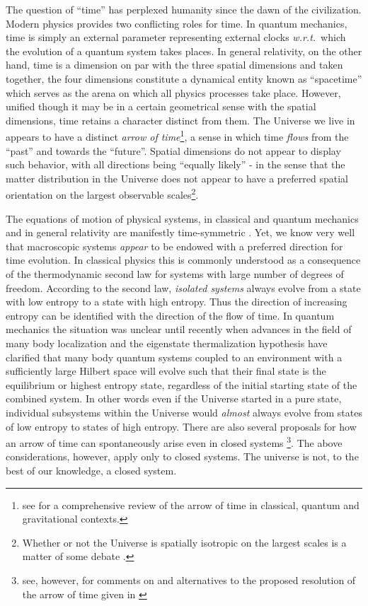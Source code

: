 \documentclass[preprint]{SciPost}
\newcommand{\wrt}{\textit{w.r.t.}~}
\theoremstyle{plain} %
\begin{document}
The question of ``time'' has perplexed humanity since the dawn of the civilization. Modern physics provides two conflicting roles for time. In quantum mechanics, time is simply an external parameter representing external clocks \wrt which the evolution of a quantum system takes places. In general relativity, on the other hand, time is a dimension on par with the three spatial dimensions and taken together, the four dimensions constitute a dynamical entity known as ``spacetime'' which serves as the arena on which all physics processes take place. However, unified though it may be in a certain geometrical sense with the spatial dimensions, time retains a character distinct from them. The Universe we live in appears to have a distinct \textit{arrow of time}\footnote{see \cite{Zeh1989The-Physical} for a comprehensive review of the arrow of time in classical, quantum and gravitational contexts.}, a sense in which time \emph{flows} from the ``past'' and towards the ``future''. Spatial dimensions do not appear to display such behavior, with all directions being ``equally likely'' - in the sense that the matter distribution in the Universe does not appear to have a preferred spatial orientation on the largest observable scales\footnote{Whether or not the Universe is spatially isotropic on the largest scales is a matter of some debate \cite{Land2005Examination}.}.

The equations of motion of physical systems, in classical and quantum mechanics and in general relativity are manifestly time-symmetric \cite{Ardakani2018Time,Roberts2012Time}. Yet, we know very well that macroscopic systems \emph{appear} to be endowed with a preferred direction for time evolution. In classical physics this is commonly understood as a consequence of the thermodynamic second law for systems with large number of degrees of freedom. According to the second law, \emph{isolated systems} always evolve from a state with low entropy to a state with high entropy. Thus the direction of increasing entropy can be identified with the direction of the flow of time. In quantum mechanics the situation was unclear until recently when advances in the field of many body localization and the eigenstate thermalization hypothesis \cite{Popescu2006Entanglement, Linden2009Quantum,Nandkishore2015Many-Body,Goold2016The-role} have clarified that many body quantum systems coupled to an environment with a sufficiently large Hilbert space will evolve such that their final state is the equilibrium or highest entropy state, regardless of the initial starting state of the combined system. In other words even if the Universe started in a pure state, individual subsystems within the Universe would \emph{almost} always evolve from states of low entropy to states of high entropy. There are also several proposals for how an arrow of time can spontaneously arise even in closed systems \cite{Maccone2009Quantum,Barbour2014The-Solution,Barbour2013A-Gravitational,Barbour2014Identification}\footnote{see, however, \cite{Jennings2010Entanglement,Jennings2009Comment,Maccone2009Quantum} for comments on and alternatives to the proposed resolution of the arrow of time given in \cite{Maccone2009Quantum}}. The above considerations, however, apply only to closed systems. The universe is not, to the best of our knowledge, a closed system.
\end{document}

